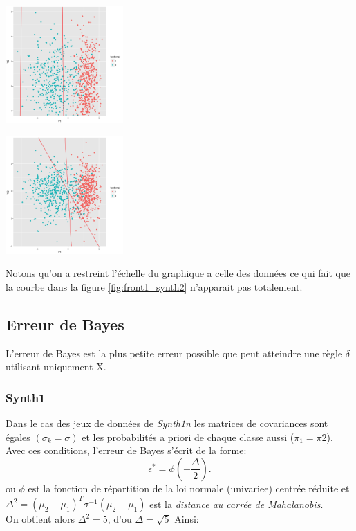 \documentclass[10pt]{article}
\begin{document}
\begin{minipage}{.5\textwidth}
	\includegraphics[width=45mm]{Figures/Exo2/curve_synth2.png}
	\label{fig:front1_synth2}
\end{minipage}%
\hspace{0.02\linewidth}
\begin{minipage}{.5\textwidth}
	\includegraphics[width=45mm]{Figures/Exo2/linear2_synth2.png}
	\label{fig:front2_synth2}
\end{minipage}

\vspace{1mm}
Notons qu'on a restreint l'échelle du graphique a celle des données ce qui fait que la courbe dans la figure \ref{fig:front1_synth2}  n'apparait pas totalement.

\subsection{Erreur de Bayes}
L'erreur de Bayes  est la plus petite erreur possible que peut atteindre une règle $\delta$ utilisant uniquement X. 
\subsubsection{Synth1}
Dans le cas des jeux de données de \textit{Synth1n} les matrices de covariances sont égales $(\sigma_{k} = \sigma)$ et les probabilités a priori de chaque classe aussi  ($\pi_{1} = \pi{2}$). Avec ces conditions, l'erreur de Bayes s'écrit de la forme: \[ \epsilon^{*} = \phi(-\frac{\Delta}{2}) . \]
ou $\phi$ est la fonction de répartition de la loi normale (univariee) centrée réduite  et $ \Delta^{2}   = (\mu_{2} - \mu_{1})^{T} \sigma^{-1} (\mu_{2}  - \mu_{1})$ est la \textit{distance au carrée de Mahalanobis}.\\
On obtient alors $\Delta^{2} = 5$, d'ou $\Delta = \sqrt{5} $ Ainsi: 
\end{document}
